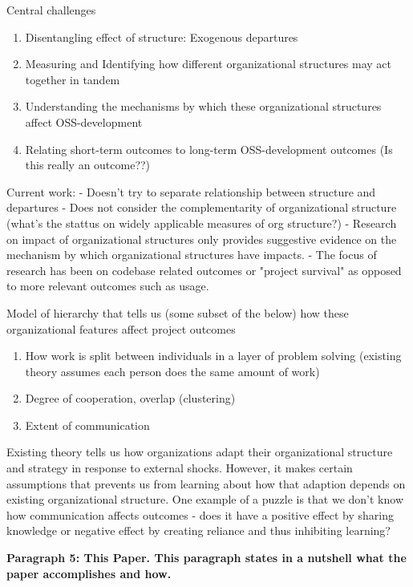 \documentclass[source/paper/main.tex]{subfiles}
\begin{document}
Central challenges
\begin{enumerate}
    \item Disentangling effect of structure: Exogenous departures
    \item Measuring and Identifying how different organizational structures may act together in tandem
    \item Understanding the mechanisms by which these organizational structures affect OSS-development
    \item Relating short-term outcomes to long-term OSS-development outcomes (Is this really an outcome??)
\end{enumerate}
Current work: 
- Doesn't try to separate relationship between structure and departures
- Does not consider the complementarity of organizational structure (what's the stattus on widely applicable measures of org structure?)
- Research on impact of organizational structures only provides suggestive evidence on the mechanism by which organizational structures have impacts. 
- The focus of research has been on codebase related outcomes or "project survival" as opposed to more relevant outcomes such as usage. 

Model of hierarchy that tells us (some subset of the below) how these organizational features affect project outcomes
\begin{enumerate}
    \item How work is split between individuals in a layer of problem solving (existing theory assumes each person does the same amount of work)
    \item Degree of cooperation, overlap (clustering)
    \item Extent of communication 
\end{enumerate}
Existing theory tells us how organizations adapt their organizational structure and strategy in response to external shocks. However, it makes certain assumptions that prevents us from learning about how that adaption depends on existing organizational structure. One example of a puzzle is that we don't know how communication affects outcomes - does it have a positive effect by sharing knowledge or negative effect by creating reliance and thus inhibiting learning?

\textbf{Paragraph 5: This Paper. This paragraph states in a nutshell what the paper accomplishes and how. }
\end{document}
